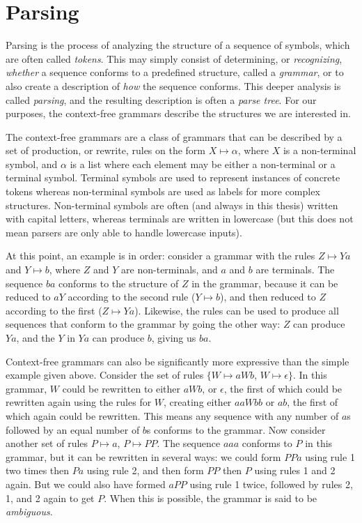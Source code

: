 
\chapter{Parsing} \label{Parsing}

	Parsing is the process of analyzing the structure of a sequence of symbols,
	which are often called \emph{tokens}. This may simply consist of
	determining, or \emph{recognizing}, \emph{whether} a sequence conforms to a
	predefined structure, called a \emph{grammar}, or to also create a
	description of \emph{how} the sequence conforms. This deeper analysis is
	called \emph{parsing}, and the resulting description is often a \emph{parse
	tree}.  For our purposes, the context-free grammars describe the
	structures we are interested in.

	The context-free grammars are a class of grammars that can be described by
	a set of production, or rewrite, rules on the form $X \mapsto \alpha$,
	where $X$ is a non-terminal symbol, and $\alpha$ is a list where each
	element may be either a non-terminal or a terminal symbol. Terminal symbols
	are used to represent instances of concrete tokens whereas non-terminal
	symbols are used as labels for more complex structures.
	Non-terminal symbols are often (and always in this thesis) written with
	capital letters, whereas terminals are written in lowercase (but this does
	not mean parsers are only able to handle lowercase inputs).

	At this point, an example is in order: consider a grammar with the rules $Z
	\mapsto Ya$ and $Y \mapsto b$, where $Z$ and $Y$ are non-terminals, and $a$
	and $b$ are terminals.  The sequence $ba$ conforms to the structure of $Z$
	in the grammar, because it can be reduced to $aY$ according to the second
	rule ($Y \mapsto b$), and then reduced to $Z$ according to the first ($Z
	\mapsto Ya$).  Likewise, the rules can be used to produce all sequences
	that conform to the grammar by going the other way: $Z$ can produce $Ya$,
	and the $Y$ in $Ya$ can produce $b$, giving us $ba$.

	Context-free grammars can also be significantly more expressive than the
	simple example given above. Consider the set of rules $\{W \mapsto aWb$, $W
	\mapsto \epsilon\}$. In this grammar, $W$ could be rewritten to either
	$aWb$, or $\epsilon$, the first of which could be rewritten again using the
	rules for $W$, creating either $aaWbb$ or $ab$, the first of which again
	could be rewritten. This means any sequence with any number of $a$s
	followed by an equal number of $b$s conforms to the grammar. Now consider
	another set of rules {$P \mapsto a$, $P \mapsto PP$}. The sequence $aaa$
	conforms to $P$ in this grammar, but it can be rewritten in several ways:
	we could form $PPa$ using rule 1 two times then $Pa$ using rule 2, and then
	form $PP$ then $P$ using rules 1 and 2 again. But we could also have formed
	$aPP$ using rule 1 twice, followed by rules 2, 1, and 2 again to get $P$.
	When this is possible, the grammar is said to be \emph{ambiguous}.

